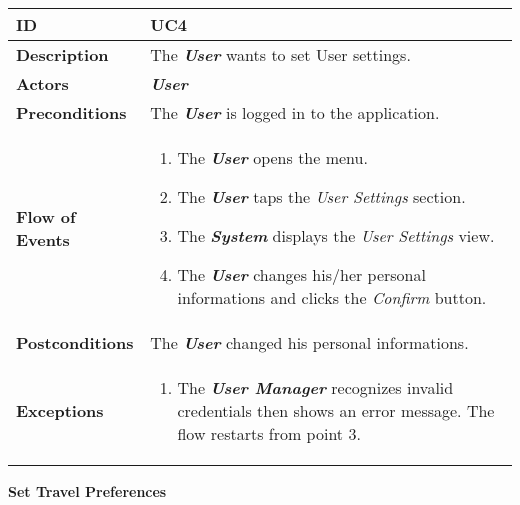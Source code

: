 \begin{tabularx}{\linewidth}{| l | X |}
	\hline
	\textbf{ID} & UC4\\
	
	\hline
	\textbf{Description} & The \textbf{\textit{User}} wants to set User settings.\\
	
	\hline
	\textbf{Actors} & \textbf{\textit{User}}\\
	
	\hline
	\textbf{Preconditions} & The \textbf{\textit{User}} is logged in to the application.\\
	
	\hline
	\textbf{Flow of Events} & \parbox{0.7\textwidth}{\begin{enumerate}
			\item The \textbf{\textit{User}} opens the menu.
			\item The \textbf{\textit{User}} taps the \textit{User Settings} section.
			\item The \textbf{\textit{System}} displays the \textit{User Settings} view.
			\item The \textbf{\textit{User}} changes his/her personal informations and clicks the \textit{Confirm} button.
	\end{enumerate}}\\
	
	\hline
	\textbf{Postconditions} & The \textbf{\textit{User}} changed his personal informations.\\
	
	\hline
	\textbf{Exceptions} & \parbox{0.7\textwidth}{\begin{enumerate}
			\item The \textbf{\textit{User Manager}} recognizes invalid credentials then shows an error message. The flow restarts from point 3.
		\end{enumerate}}\\
	
	\hline
	
\end{tabularx}

\begin{center}
	\textbf{Set Travel Preferences}
\end{center}

